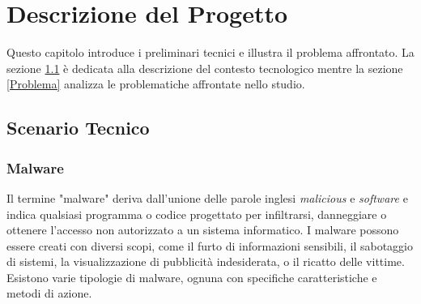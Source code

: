 \chapter{Descrizione del Progetto}
\label{cap:descrizione}
Questo capitolo introduce i preliminari tecnici e illustra il problema affrontato. La sezione \ref{Scenario} è dedicata alla descrizione del contesto tecnologico mentre la sezione \ref{Problema} analizza le problematiche affrontate nello studio. 

\section{Scenario Tecnico}
\label{Scenario}

\subsection{Malware}
Il termine "malware" deriva dall'unione delle parole inglesi \emph{malicious} e \emph{software} e indica qualsiasi programma o codice progettato per infiltrarsi, danneggiare o ottenere l'accesso non autorizzato a un sistema informatico. I malware possono essere creati con diversi scopi, come il furto di informazioni sensibili, il sabotaggio di sistemi, la visualizzazione di pubblicità indesiderata, o il ricatto delle vittime. Esistono varie tipologie di malware, ognuna con specifiche caratteristiche e metodi di azione.

